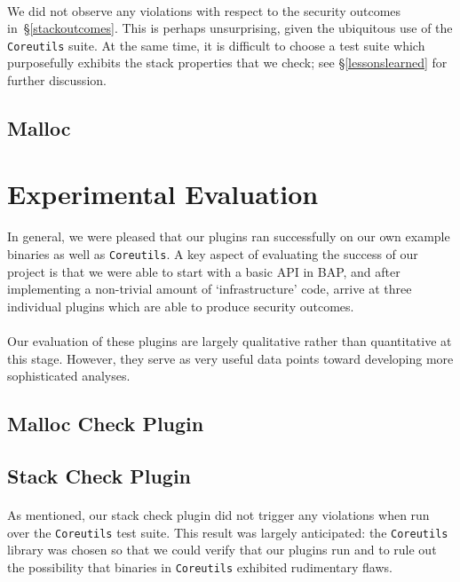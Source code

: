 \documentclass[letterpaper,11pt]{article}
\begin{document}
\paragraph{}
We did not observe any violations with respect to the security outcomes
in~\S\ref{stackoutcomes}. This is perhaps unsurprising, given the ubiquitous
use of the \texttt{Coreutils} suite. At the same time, it is difficult to
choose a test suite which purposefully exhibits the stack properties that we
check; see \S\ref{lessonslearned} for further discussion.

\subsection{Malloc}


\section{Experimental Evaluation}

\paragraph{}
In general, we were pleased that our plugins ran successfully on our own
example binaries as well as \texttt{Coreutils}. A key aspect of evaluating
the success of our project is that we were able to start with a basic API in
BAP, and after implementing a non-trivial amount of `infrastructure' code,
arrive at three individual plugins which are able to produce security outcomes.

\paragraph{}
Our evaluation of these plugins are largely qualitative rather than
quantitative at this stage. However, they serve as very useful data points
toward developing more sophisticated analyses.

\subsection{Malloc Check Plugin}


\subsection{Stack Check Plugin}

\paragraph{}
As mentioned, our stack check plugin did not trigger any violations when run
over the \texttt{Coreutils} test suite. This result was largely anticipated:
the \texttt{Coreutils} library was chosen so that we could verify that our
plugins run and to rule out the possibility that binaries in \texttt{Coreutils}
exhibited rudimentary flaws.
\end{document}
